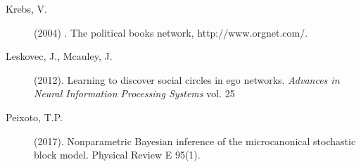
\begin{description}

	

	
	\item[Krebs, V.] (2004) . The political books network,
	http://www.orgnet.com/.

	\item[Leskovec, J., Mcauley, J.] (2012).
	Learning to discover social circles in ego networks.
	{\it Advances in Neural Information Processing Systems} vol. 25


	

	\item[Peixoto, T.P.] (2017).
	Nonparametric Bayesian inference of the microcanonical
	stochastic block model. Physical Review E 95(1).



\end{description}
